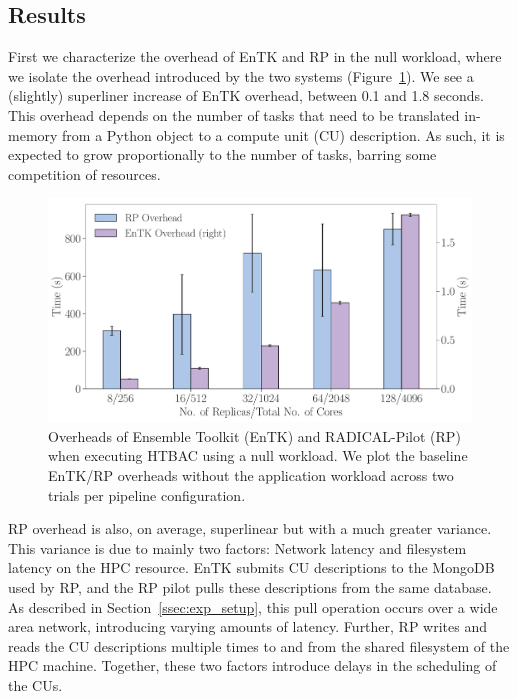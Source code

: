 \subsection{Results}\label{ssec:exp_results}

First we characterize the overhead of EnTK and RP in the null workload, where
we isolate the overhead introduced by the two systems
(Figure~\ref{fig:exp1}). We see a (slightly) superliner increase of EnTK
overhead, between 0.1 and 1.8 seconds. This overhead depends on the number of
tasks that need to be translated in-memory from a Python object to a compute
unit (CU) description. As such, it is expected to grow proportionally to the
number of tasks, barring some competition of resources.

\begin{figure}
  \centering
  \includegraphics[width=\columnwidth]{null_workload_overheads.pdf}
  \caption{Overheads of Ensemble Toolkit (EnTK) and RADICAL-Pilot (RP) when
           executing HTBAC using a null workload. We plot the baseline
           EnTK/RP overheads without the application workload across two
           trials per pipeline configuration.}\label{fig:exp1}
\end{figure}

RP overhead is also, on average, superlinear but with a much greater
variance. This variance is due to mainly two factors: Network latency and
filesystem latency on the HPC resource. EnTK submits CU descriptions to the
MongoDB used by RP, and the RP pilot pulls these descriptions from the same
database. As described in Section~\ref{ssec:exp_setup}, this pull operation
occurs over a wide area network, introducing varying amounts of latency.
Further, RP writes and reads the CU descriptions multiple times to and
from the shared filesystem of the HPC machine. Together, these two factors
introduce delays in the scheduling of the CUs.

